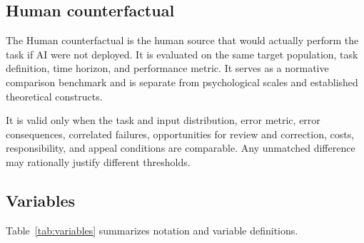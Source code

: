\documentclass[11pt,a4paper]{article}
\begin{document}
\subsection{Human counterfactual}

The Human counterfactual is the human source that would actually perform the task if AI were not deployed. It is evaluated on the same target population, task definition, time horizon, and performance metric. It serves as a normative comparison benchmark and is separate from psychological scales and established theoretical constructs.

It is valid only when the task and input distribution, error metric, error consequences, correlated failures, opportunities for review and correction, costs, responsibility, and appeal conditions are comparable. Any unmatched difference may rationally justify different thresholds.

\subsection{Variables}

Table~\ref{tab:variables} summarizes notation and variable definitions.
\end{document}
